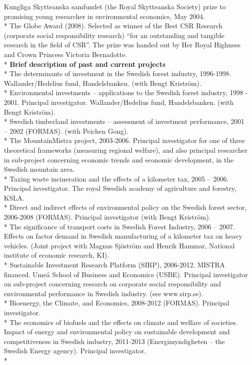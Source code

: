 \documentclass[10pt,a4paper]{article}
\begin{document}
Kungliga Skytteanska samfundet (the Royal Skytteanska Society) prize to promising young researcher in environmental economics, May 2004.\\*
The Globe Award (2008). Selected as winner of the Best CSR Research (corporate social responsibility research) “for an outstanding and tangible research in the field of CSR”. The prize was handed out by Her Royal Highness and Crown Princess Victoria Bernadotte.\\*
\textbf{Brief description of past and current projects}\\*
The determinants of investment in the Swedish forest industry, 1996-1998. Wallander/Hedelius fund, Handelsbanken. (with Bengt Kriström).\\*
Environmental investments – applications to the Swedish forest industry, 1998 - 2001. Principal investigator. Wallander/Hedelius fund, Handelsbanken. (with Bengt Kriström).\\*
Swedish timberland investments – assessment of investment performance, 2001 – 2002 (FORMAS). (with Peichen Gong).\\*
The MountainMistra project, 2003-2006. Principal investigator for one of three theoretical frameworks (measuring regional welfare), and also principal researcher in sub-project concerning economic trends and economic development, in the Swedish mountain area.\\*
Taxing waste incineration and the effects of a kilometer tax, 2005 – 2006. Principal investigator. The royal Swedish academy of agriculture and forestry, KSLA.\\*
Direct and indirect effects of environmental policy on the Swedish forest sector, 2006-2008 (FORMAS). Principal investigator (with Bengt Kriström).\\*
The significance of transport costs in Swedish Forest Industry, 2006 – 2007. Effects on factor demand in Swedish manufacturing of a kilometer tax on heavy vehicles. (Joint project with Magnus Sjöström and Henrik Hammar, National institute of economic research, KI).\\*
Sustainable Investment Research Platform (SIRP), 2006-2012. MISTRA financed. Umeå School of Business and Economics (USBE). Principal investigator on sub-project concerning research on corporate social responsibility and environmental performance in Swedish industry. (see www.sirp.se).\\*
Bioenergy, the Climate, and Economics, 2008-2012 (FORMAS). Principal investigator.\\*
The economics of biofuels and the effects on climate and welfare of societies. Impact of energy and environmental policy on sustainable development and competitiveness in Swedish industry, 2011-2013 (Energimyndigheten – the Swedish Energy agency). Principal investigator.\\*
\end{document}
